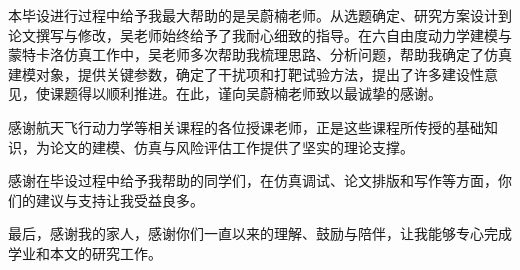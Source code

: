 
\begin{acknowledgements}

    本毕设进行过程中给予我最大帮助的是吴蔚楠老师。从选题确定、研究方案设计到论文撰写与修改，吴老师始终给予了我耐心细致的指导。在六自由度动力学建模与蒙特卡洛仿真工作中，吴老师多次帮助我梳理思路、分析问题，帮助我确定了仿真建模对象，提供关键参数，确定了干扰项和打靶试验方法，提出了许多建设性意见，使课题得以顺利推进。在此，谨向吴蔚楠老师致以最诚挚的感谢。

    感谢航天飞行动力学等相关课程的各位授课老师，正是这些课程所传授的基础知识，为论文的建模、仿真与风险评估工作提供了坚实的理论支撑。

    感谢在毕设过程中给予我帮助的同学们，在仿真调试、论文排版和写作等方面，你们的建议与支持让我受益良多。

    最后，感谢我的家人，感谢你们一直以来的理解、鼓励与陪伴，让我能够专心完成学业和本文的研究工作。

\end{acknowledgements}
